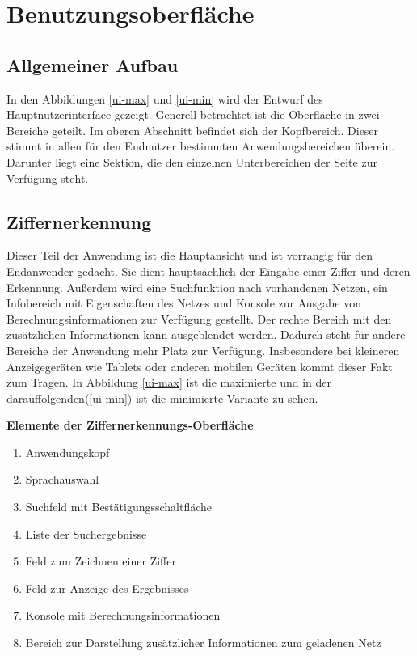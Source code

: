 \newpage
\section{Benutzungsoberfläche}
\subsection{Allgemeiner Aufbau}
In den Abbildungen \ref{ui-max} und \ref{ui-min} wird der  Entwurf des Hauptnutzerinterface gezeigt. Generell betrachtet ist die Oberfläche in zwei Bereiche geteilt. Im oberen Abschnitt befindet sich der Kopfbereich. Dieser stimmt in allen für den Endnutzer bestimmten Anwendungsbereichen überein. Darunter liegt eine Sektion, die den einzelnen Unterbereichen der Seite zur Verfügung steht.

\subsection{Ziffernerkennung}
Dieser Teil der Anwendung ist die Hauptansicht und ist vorrangig für den Endanwender gedacht. Sie dient hauptsächlich der Eingabe einer Ziffer und deren Erkennung. Außerdem wird eine Suchfunktion nach vorhandenen Netzen, ein Infobereich mit Eigenschaften des Netzes und Konsole zur Ausgabe von Berechnungsinformationen zur Verfügung gestellt. Der rechte  Bereich mit den zusätzlichen Informationen kann ausgeblendet werden. Dadurch steht für andere Bereiche der Anwendung mehr Platz zur Verfügung. Insbesondere bei kleineren Anzeigegeräten wie Tablets oder anderen mobilen Geräten kommt dieser Fakt zum Tragen. In Abbildung \ref{ui-max} ist die maximierte und in der darauffolgenden(\ref{ui-min}) ist die minimierte Variante zu sehen.
 
 \textbf{Elemente der Ziffernerkennungs-Oberfläche}
 \begin{enumerate}
 	\item Anwendungskopf
 	\item Sprachauswahl
 	\item Suchfeld mit Bestätigungsschaltfläche
 	\item Liste der Suchergebnisse
 	\item Feld zum Zeichnen einer Ziffer
 	\item Feld zur Anzeige des Ergebnisses
 	\item Konsole mit Berechnungsinformationen
 	\item Bereich zur Darstellung zusätzlicher Informationen zum geladenen Netz
 \end{enumerate}
 
